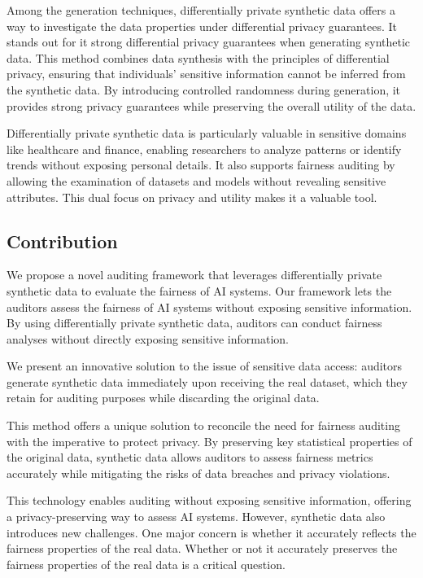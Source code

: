 \documentclass[manuscript,screen,review,anonymous]{acmart}
\begin{document}
Among the generation techniques, differentially private synthetic data offers a way to investigate the data properties under differential privacy guarantees. It stands out for it strong differential privacy guarantees when generating synthetic data. This method combines data synthesis with the principles of differential privacy, ensuring that individuals' sensitive information cannot be inferred from the synthetic data. By introducing controlled randomness during generation, it provides strong privacy guarantees while preserving the overall utility of the data.

Differentially private synthetic data is particularly valuable in sensitive domains like healthcare and finance, enabling researchers to analyze patterns or identify trends without exposing personal details. It also supports fairness auditing by allowing the examination of datasets and models without revealing sensitive attributes. This dual focus on privacy and utility makes it a valuable tool.

\subsection{Contribution}


We propose a novel auditing framework that leverages differentially private synthetic data to evaluate the fairness of AI systems. Our framework lets the auditors assess the fairness of AI systems without exposing sensitive information. By using differentially private synthetic data, auditors can conduct fairness analyses without directly exposing sensitive information.

We present an innovative solution to the issue of sensitive data access: auditors generate synthetic data immediately upon receiving the real dataset, which they retain for auditing purposes while discarding the original data.

This method offers a unique solution to reconcile the need for fairness auditing with the imperative to protect privacy. By preserving key statistical properties of the original data, synthetic data allows auditors to assess fairness metrics accurately while mitigating the risks of data breaches and privacy violations.

This technology enables auditing without exposing sensitive information, offering a privacy-preserving way to assess AI systems. However, synthetic data also introduces new challenges. One major concern is whether it accurately reflects the fairness properties of the real data. Whether or not it accurately preserves the fairness properties of the real data is a critical question.
\end{document}
